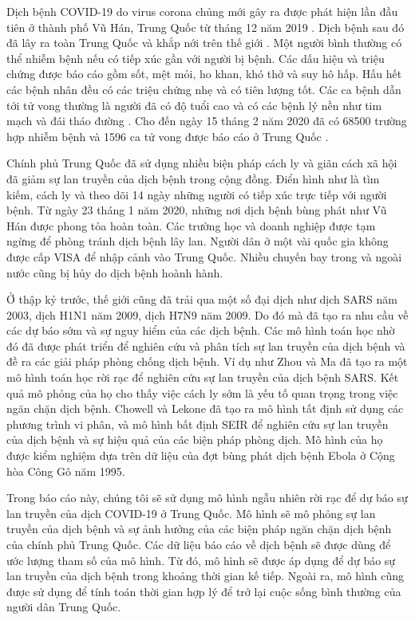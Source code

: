 \documentclass[../main.tex]{subfiles}
\begin{document}
Dịch bệnh COVID-19 do virus corona chủng mới gây ra được phát hiện lần đầu tiên ở thành phố Vũ Hán, Trung Quốc từ tháng 12 năm 2019 \cite{WHOcoronavirus}. Dịch bệnh sau đó đã lây ra toàn Trung Quốc và khắp nới trên thế giới \cite{WHOoutbreaknews, WHOsituation}. Một người bình thường có thể nhiễm bệnh nếu có tiếp xúc gần với người bị bệnh. Các dấu hiệu và triệu chứng được báo cáo gồm sốt, mệt mỏi, ho khan, khó thở và suy hô hấp. Hấu hết các bệnh nhân đều có các triệu chứng nhẹ và có tiên lượng tốt. Các ca bệnh dẫn tới tử vong thường là người đã có độ tuổi cao và có các bệnh lý nền như tim mạch và đái tháo đường \cite{WHOcoronavirus}. Cho đến ngày 15 tháng 2 năm 2020 đã có 68500 trường hợp nhiễm bệnh và 1596 ca tử vong được báo cáo ở Trung Quốc \cite{NHCChina}.

Chính phủ Trung Quốc đã sử dụng nhiều biện pháp cách ly và giãn cách xã hội đã giảm sự lan truyền của dịch bệnh trong cộng đồng. Điển hình như là tìm kiếm, cách ly và theo dõi  14 ngày những người có tiếp xúc trực tiếp với người bệnh. Từ ngày 23 tháng 1 năm 2020, những nơi dịch bệnh bùng phát như Vũ Hán được phong tỏa hoàn toàn. Các trường học và doanh nghiệp được tạm ngừng để phòng tránh dịch bệnh lây lan. Người dân ở một vài quốc gia không được cấp VISA để nhập cảnh vào Trung Quốc. Nhiều chuyến bay trong và ngoài nước cũng bị hủy do dịch bệnh hoành hành.

Ở thập kỷ trước, thế giới cũng đã trải qua một số đại dịch như dịch SARS năm 2003, dịch H1N1 năm 2009, dịch H7N9 năm 2009. Do đó mà đã tạo ra nhu cầu về các dự báo sớm và sự nguy hiểm của các dịch bệnh. Các mô hình toán học nhờ đó đã được phát triển để nghiên cứu và phân tích sự lan truyền của dịch bệnh và đề ra các giải pháp phòng chống dịch bệnh. Ví dụ như Zhou và Ma \cite{sars1} đã tạo ra một mô hình toán học rời rạc để nghiên cứu sự lan truyền của dịch bệnh SARS. Kết quả mô phỏng của họ cho thấy việc cách ly sớm là yếu tố quan trọng trong việc ngăn chặn dịch bệnh. Chowell \cite{sars2} và Lekone \cite{seir} đã tạo ra mô hình tất định sử dụng các phương trình vi phân, và mô hình bất định SEIR để nghiên cứu sự lan truyền của dịch bệnh và sự hiệu quả của các biện pháp phòng dịch. Mô hình của họ được kiểm nghiệm dựa trên dữ liệu của đợt bùng phát dịch bệnh Ebola ở Cộng hòa Công Gô năm 1995.

Trong báo cáo này, chúng tôi sẽ sử dụng mô hình ngẫu nhiên rời rạc để dự báo sự lan truyền của dịch COVID-19 ở Trung Quốc. Mô hình sẽ mô phỏng sự lan truyền của dịch bệnh và sự ảnh hưởng của các biện pháp ngăn chặn dịch bệnh của chính phủ Trung Quốc. Các dữ liệu báo cáo về dịch bệnh sẽ được dùng để ước lượng tham số của mô hình. Từ đó, mô hình sẽ được áp dụng để dự báo sự lan truyền của dịch bệnh trong khoảng thời gian kế tiếp. Ngoài ra, mô hình cũng được sử dụng để tính toán thời gian hợp lý để trở lại cuộc sống bình thường của người dân Trung Quốc.
\end{document}
